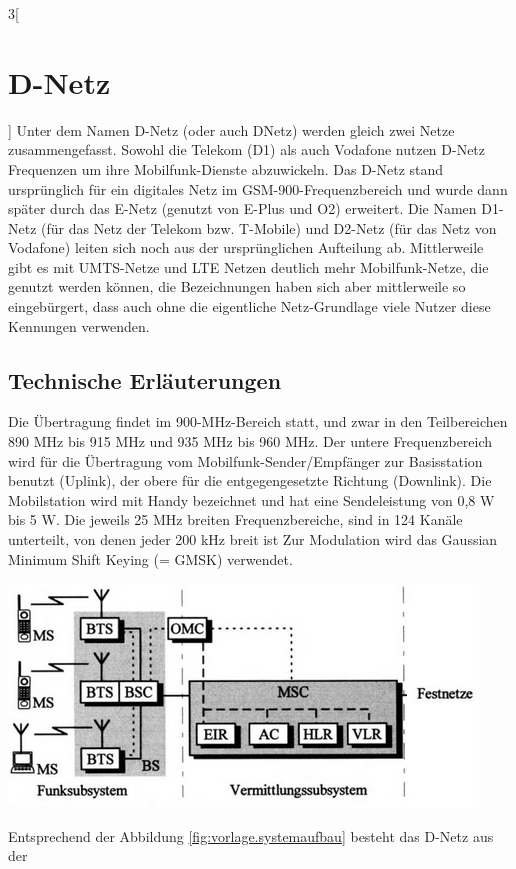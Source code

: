 \begin{multicols}{3}[\section {D-Netz}]
Unter dem Namen D-Netz (oder auch DNetz) werden gleich zwei Netze zusammengefasst. Sowohl die Telekom (D1) als auch Vodafone nutzen D-Netz Frequenzen um ihre Mobilfunk-Dienste abzuwickeln. Das D-Netz stand ursprünglich für ein digitales Netz im GSM-900-Frequenzbereich und wurde dann später durch das E-Netz (genutzt von E-Plus und O2) erweitert. Die Namen D1-Netz (für das Netz der Telekom bzw. T-Mobile) und D2-Netz (für das Netz von Vodafone) leiten sich noch aus der ursprünglichen Aufteilung ab.
Mittlerweile gibt es mit UMTS-Netze und LTE Netzen deutlich mehr Mobilfunk-Netze, die genutzt werden können, die Bezeichnungen haben sich aber mittlerweile so eingebürgert, dass auch ohne die eigentliche Netz-Grundlage viele Nutzer diese Kennungen verwenden.


\subsection*{Technische Erläuterungen}

Die Übertragung findet im 900-MHz-Bereich statt, und zwar in den Teilbereichen 890 MHz bis 915 MHz und 935 MHz bis 960 MHz. Der untere Frequenzbereich wird für die Übertragung vom Mobilfunk-Sender/Empfänger zur Basisstation benutzt (Uplink), der obere für die entgegengesetzte Richtung (Downlink). Die Mobilstation wird mit Handy bezeichnet und hat eine Sendeleistung von 0,8 W bis 5 W. Die jeweils 25 MHz breiten Frequenzbereiche, sind in 124 Kanäle unterteilt, von denen jeder 200 kHz breit ist Zur Modulation wird das Gaussian Minimum Shift Keying (= GMSK) verwendet. 

\begin{Figure}
\includegraphics[width=\linewidth]{Kapitel/DNetz/Grafiken/systemaufbau.png}
\label{fig:vorlage.systemaufbau}
\end{Figure}

Entsprechend der Abbildung \ref{fig:vorlage.systemaufbau} besteht das D-Netz aus der 


\end{multicols}
